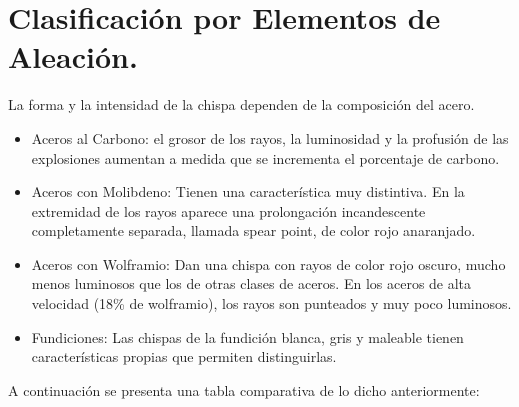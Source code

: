 \documentclass[12pt,a4paper]{article}
\begin{document}
\section{Clasificación por Elementos de Aleación.}

La forma y la intensidad de la chispa dependen de la composición del acero.
\begin{itemize}
    \item Aceros al Carbono: el grosor de los rayos, la luminosidad y la profusión de las explosiones aumentan a medida que se incrementa el porcentaje de carbono.
    \item Aceros con Molibdeno: Tienen una característica muy distintiva. En la extremidad de los rayos aparece una prolongación incandescente completamente separada, llamada \textacutedbl{}spear point\textacutedbl{}, de color rojo anaranjado.
    \item Aceros con Wolframio: Dan una chispa con rayos de color rojo oscuro, mucho menos luminosos que los de otras clases de aceros. En los aceros de alta velocidad (18\% de wolframio), los rayos son punteados y muy poco luminosos.
    \item Fundiciones: Las chispas de la fundición blanca, gris y maleable tienen características propias que permiten distinguirlas.
\end{itemize}

A continuación se presenta una tabla comparativa de lo dicho anteriormente:
\end{document}
